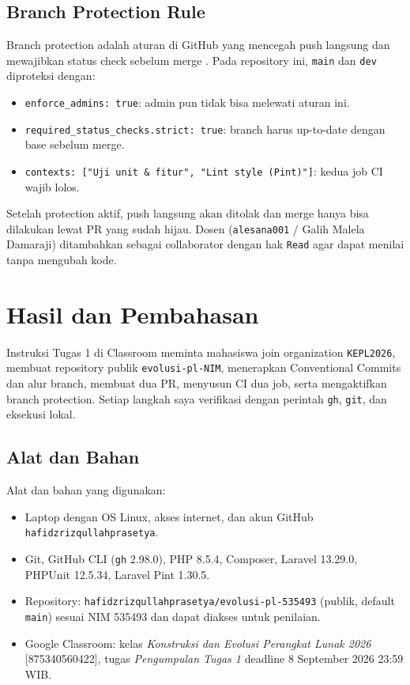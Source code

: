 \documentclass[a4paper,oneside,12pt]{report}
\newcommand{\tocboldsection}[1]{%
  \protect\renewcommand{\protect\cftchapfont}{\protect\bfseries}%
  #1%
  \protect\renewcommand{\protect\cftchapfont}{}%
}
\begin{document}
\section{Branch Protection Rule}
Branch protection adalah aturan di GitHub yang mencegah push langsung dan mewajibkan status check sebelum merge \cite{github-protection}. Pada repository ini, \texttt{main} dan \texttt{dev} diproteksi dengan:
\begin{itemize}
    \item \texttt{enforce\_admins: true}: admin pun tidak bisa melewati aturan ini.
    \item \texttt{required\_status\_checks.strict: true}: branch harus up-to-date dengan base sebelum merge.
    \item \texttt{contexts: ["Uji unit \& fitur", "Lint style (Pint)"]}: kedua job CI wajib lolos.
\end{itemize}
Setelah protection aktif, push langsung akan ditolak dan merge hanya bisa dilakukan lewat PR yang sudah hijau. Dosen (\texttt{alesana001} / Galih Malela Damaraji) ditambahkan sebagai collaborator dengan hak \texttt{Read} agar dapat menilai tanpa mengubah kode.

\clearpage

\chapter[\tocboldsection{Hasil dan Pembahasan}]{Hasil dan Pembahasan}
Instruksi Tugas 1 di Classroom meminta mahasiswa join organization \texttt{KEPL2026}, membuat repository publik \texttt{evolusi-pl-NIM}, menerapkan Conventional Commits dan alur branch, membuat dua PR, menyusun CI dua job, serta mengaktifkan branch protection. Setiap langkah saya verifikasi dengan perintah \texttt{gh}, \texttt{git}, dan eksekusi lokal.

\section{Alat dan Bahan}
Alat dan bahan yang digunakan:
\begin{itemize}
    \item Laptop dengan OS Linux, akses internet, dan akun GitHub \texttt{hafidzrizqullahprasetya}.
    \item Git, GitHub CLI (\texttt{gh} 2.98.0), PHP 8.5.4, Composer, Laravel 13.29.0, PHPUnit 12.5.34, Laravel Pint 1.30.5.
    \item Repository: \texttt{hafidzrizqullahprasetya/evolusi-pl-535493} (publik, default \texttt{main}) sesuai NIM 535493 dan dapat diakses untuk penilaian.
    \item Google Classroom: kelas \textit{Konstruksi dan Evolusi Perangkat Lunak 2026} [875340560422], tugas \textit{Pengumpulan Tugas 1} deadline 8 September 2026 23:59 WIB.
\end{itemize}
\end{document}
